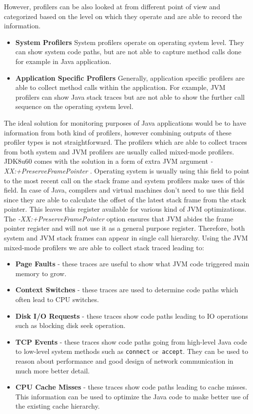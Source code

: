 However, profilers can be also looked at from different point of view and categorized based on the level on which they operate and are able to record the information.
\begin{itemize}
	\item \textbf{System Profilers} \newline
	System profilers operate on operating system level. They can show system code paths, but are not able to capture method calls done for example in Java application.
	\item \textbf{Application Specific Profilers} \newline
	Generally, application specific profilers are able to collect method calls within the application. For example, JVM profilers can show Java stack traces but are not able to show the further call sequence on the operating system level.

\end{itemize}
The ideal solution for monitoring purposes of Java applications would be to have information from both kind of profilers, however combining outputs of these profiler types is not straightforward. The profilers which are able to collect traces from both system and JVM profilers are usually called mixed-mode profilers. JDK8u60 comes with the solution in a form of extra JVM argument \textit{-XX:+PreserveFramePointer} \cite{MixedModeProfilers}.  Operating system is usually using this field to point to the most recent call on the stack frame and system profilers make uses of this field. In case of Java, compilers and virtual machines don't need to use this field since they are able to calculate the offset of the latest stack frame from the stack pointer. This leaves this register available for various kind of JVM optimizations. The \textit{-XX:+PreserveFramePointer}  option ensures that JVM abides the frame pointer register and will not use it as a general purpose register. Therefore, both system and JVM stack frames can appear in single call hierarchy. Using the JVM mixed-mode profilers we are able to collect stack traced leading to:
\begin{itemize}
	\item \textbf{Page Faults} - these traces are useful to show what JVM code triggered main memory to grow.
	\item \textbf{Context Switches} - these traces are used to determine code paths which often lead to CPU switches.
	\item\textbf{Disk I/O Requests} - these traces show code paths leading to IO operations such as blocking disk seek operation.
	\item \textbf{TCP Events} - these traces show code paths going from high-level Java code to low-level system methods such as \texttt{connect} or\texttt{ accept}. They can be used to reason about performance and good design of network communication in much more better detail.
	\item \textbf{CPU Cache Misses} - these traces show code paths leading to cache misses. This information can be used to optimize the Java code to make better use of the existing cache hierarchy.
\end{itemize}

